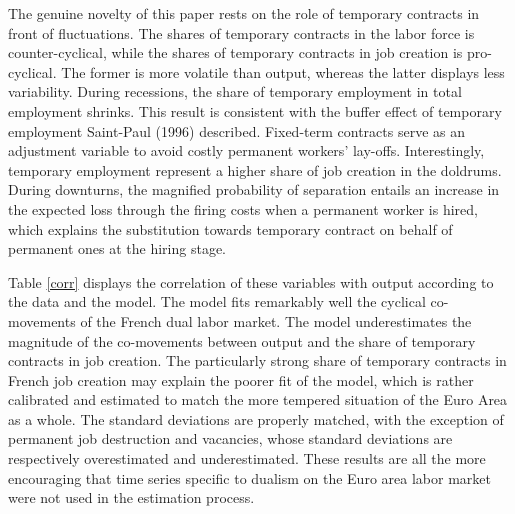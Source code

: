 \documentclass[a4paper]{article}
\begin{document}
The genuine novelty of this paper rests on the role of temporary contracts in front of fluctuations. The shares of temporary contracts in the labor force is counter-cyclical, while the shares of temporary contracts in job creation is pro-cyclical. The former is more volatile than output, whereas the latter displays less variability. During recessions, the share of temporary employment in total employment shrinks. This result is consistent with the buffer effect of temporary employment Saint-Paul (1996) described. Fixed-term contracts serve as an adjustment variable to avoid costly permanent workers' lay-offs. Interestingly, temporary employment represent a higher share of job creation in the doldrums. During downturns, the magnified probability of separation entails an increase in the expected loss through the firing costs when a permanent worker is hired, which explains the substitution towards temporary contract on behalf of permanent ones at the hiring stage.

Table \ref{corr} displays the correlation of these variables with output according to the data and the model. The model fits remarkably well the cyclical co-movements of the French dual labor market. The model underestimates the magnitude of the co-movements between output and the share of temporary contracts in job creation. The particularly strong share of temporary contracts in French job creation may explain the poorer fit of the model, which is rather calibrated and estimated to match the more tempered situation of the Euro Area as a whole. The standard deviations are properly matched, with the exception of permanent job destruction and vacancies, whose standard deviations are respectively overestimated and underestimated. These results are all the more encouraging that time series specific to dualism on the Euro area labor market were not used in the estimation process.

\end{document}

